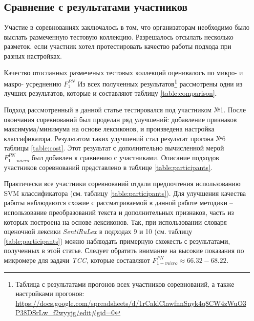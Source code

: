 \subsection{Сравнение с результатами участников}
Участие в соревнованиях заключалось в том, что организаторам необходимо
было выслать размеченную тестовую коллекцию.
Разрешалось отсылать несколько разметок, если участник хотел протестировать
качество работы подхода при разных настройках.

Качество отосланных размеченых тестовых коллекций оценивалось по микро-
и макро- усреднению $F_{1}^{PN}$
Из всех полученных результатов\footnote{
    Таблица с результатами прогонов всех участников соревнований, а также
    настройками прогонов:
    \url{https://docs.google.com/spreadsheets/d/1rCaklClawfnnSnyk4q8CW4zWuO3P38DSrLw_f2wyyjg/edit\#gid=0}
} рассмотрены одни из лучших результатов, которые и составляют таблицу \ref{table:comparison}.

Подход рассмотренный в данной статье тестировался под участником №1.
После окончания соревнований был проделан ряд улучшений: добавление
признаков максимума/минимума на основе лексиконов, и произведена настройка
классификатора.
Результатом таких улучшений стал результат прогона №6 таблицы \ref{table:cost}.
Этот результат с дополнительно вычисленной мерой $F_{1-micro}^{PN}$ был
добавлен к сравнению с участниками.
Описание подходов участников соревнований представлено в таблице
\ref{table:participants}.





Практически все участники соревнований отдали предпочтения использованию
SVM классификатора (см. таблицу \ref{table:participants}).
Для улучшения качества работы наблюдаются схожие с рассматриваемой в данной
работе методики -- использование преобразований текста и
дополнительных признаков, часть из которых построена на основе лексиконов.
Так, при использовании словаря оценочной лексики {\it SentiRuLex} в подходах 9 и 10
(см. таблицу \ref{table:participants}) можно наблюдать примерную схожесть с результатами,
полученных в этой статье.
Следует обратить внимание на высокие показания по микромере для задачи {\it TCC},
которые составляют  $F_{1-micro}^{PN} \approx 66.32-68.22$.


